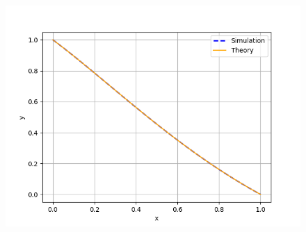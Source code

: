 \documentclass[journal]{IEEEtran}
\begin{document}
\begin{figure}[htbp]
  \centering
  \includegraphics[width=\columnwidth]{figs/curve.png}
\end{figure}
\end{document}
